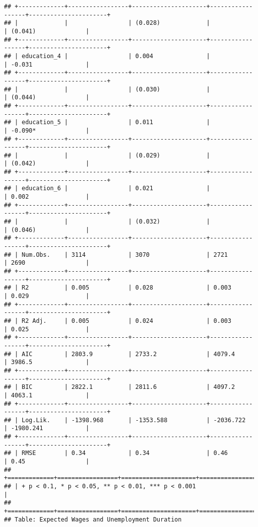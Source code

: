 \begin{verbatim}
## +-------------+-----------------+---------------------+------------------+----------------------+
## |             |                 | (0.028)             |                  | (0.041)              |
## +-------------+-----------------+---------------------+------------------+----------------------+
## | education_4 |                 | 0.004               |                  | -0.031               |
## +-------------+-----------------+---------------------+------------------+----------------------+
## |             |                 | (0.030)             |                  | (0.044)              |
## +-------------+-----------------+---------------------+------------------+----------------------+
## | education_5 |                 | 0.011               |                  | -0.090*              |
## +-------------+-----------------+---------------------+------------------+----------------------+
## |             |                 | (0.029)             |                  | (0.042)              |
## +-------------+-----------------+---------------------+------------------+----------------------+
## | education_6 |                 | 0.021               |                  | 0.002                |
## +-------------+-----------------+---------------------+------------------+----------------------+
## |             |                 | (0.032)             |                  | (0.046)              |
## +-------------+-----------------+---------------------+------------------+----------------------+
## | Num.Obs.    | 3114            | 3070                | 2721             | 2690                 |
## +-------------+-----------------+---------------------+------------------+----------------------+
## | R2          | 0.005           | 0.028               | 0.003            | 0.029                |
## +-------------+-----------------+---------------------+------------------+----------------------+
## | R2 Adj.     | 0.005           | 0.024               | 0.003            | 0.025                |
## +-------------+-----------------+---------------------+------------------+----------------------+
## | AIC         | 2803.9          | 2733.2              | 4079.4           | 3986.5               |
## +-------------+-----------------+---------------------+------------------+----------------------+
## | BIC         | 2822.1          | 2811.6              | 4097.2           | 4063.1               |
## +-------------+-----------------+---------------------+------------------+----------------------+
## | Log.Lik.    | -1398.968       | -1353.588           | -2036.722        | -1980.241            |
## +-------------+-----------------+---------------------+------------------+----------------------+
## | RMSE        | 0.34            | 0.34                | 0.46             | 0.45                 |
## +=============+=================+=====================+==================+======================+
## | + p < 0.1, * p < 0.05, ** p < 0.01, *** p < 0.001                                             |
## +=============+=================+=====================+==================+======================+
## Table: Expected Wages and Unemployment Duration
\end{verbatim}

